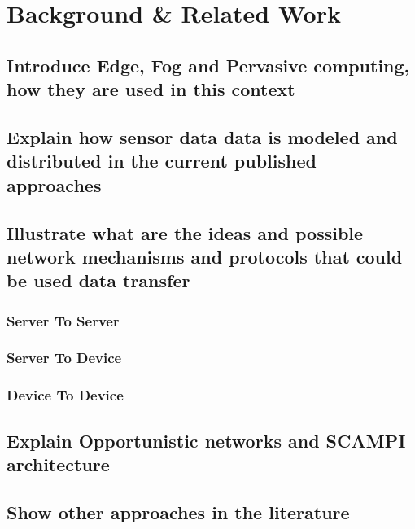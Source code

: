 
\chapter{Background \& Related Work}\label{chapter:background}



\section{Introduce Edge, Fog and Pervasive computing, how they are used in this context}

\section{Explain how sensor data data is modeled and distributed in the current published approaches}

\section{Illustrate what are the ideas and possible network mechanisms and protocols that could be used data transfer}
\subsection{Server To Server }
\subsection{Server To Device }
\subsection{Device To Device }

\section{Explain Opportunistic networks and SCAMPI architecture }
\section{Show other approaches in the literature}
